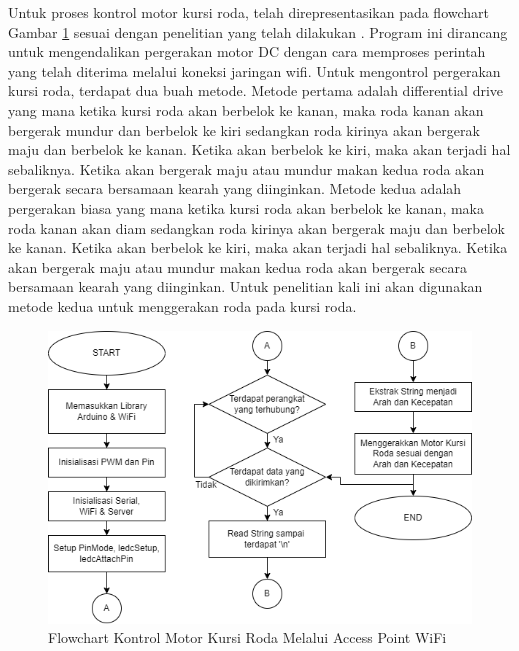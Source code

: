 Untuk proses kontrol motor kursi roda, telah direpresentasikan pada flowchart Gambar \ref{fig: Flowchart Kontrol Motor Kursi Roda Melalui Access Point WiFi} sesuai dengan penelitian yang telah dilakukan \parencite{ekatama2024perancangan}. Program ini dirancang untuk mengendalikan pergerakan motor DC dengan cara memproses perintah yang telah diterima melalui koneksi jaringan wifi. Untuk mengontrol pergerakan kursi roda, terdapat dua buah metode. Metode pertama adalah differential drive yang mana ketika kursi roda akan berbelok ke kanan, maka roda kanan akan bergerak mundur dan berbelok ke kiri sedangkan roda kirinya akan bergerak maju dan berbelok ke kanan. Ketika akan berbelok ke kiri, maka akan terjadi hal sebaliknya. Ketika akan bergerak maju atau mundur makan kedua roda akan bergerak secara bersamaan kearah yang diinginkan. Metode kedua adalah pergerakan biasa yang mana ketika kursi roda akan berbelok ke kanan, maka roda kanan akan diam sedangkan roda kirinya akan bergerak maju dan berbelok ke kanan. Ketika akan berbelok ke kiri, maka akan terjadi hal sebaliknya. Ketika akan bergerak maju atau mundur makan kedua roda akan bergerak secara bersamaan kearah yang diinginkan. Untuk penelitian kali ini akan digunakan metode kedua untuk menggerakan roda pada kursi roda.
\begin{figure}[H]
  \centering
  \includegraphics[scale=0.7]{gambar/8. Kontrol Motor WiFi.png}
  \caption{ Flowchart Kontrol Motor Kursi Roda Melalui Access Point WiFi \parencite{ekatama2024perancangan}}
  \label{fig: Flowchart Kontrol Motor Kursi Roda Melalui Access Point WiFi}
\end{figure}



